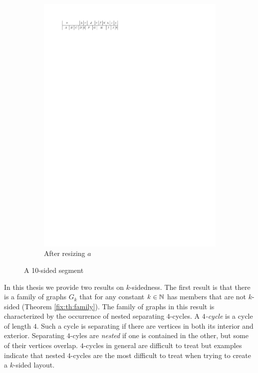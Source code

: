 \begin{figure}[b]
    \begin{subfigure}[b]{0.45 \textwidth}
      \centering
      \includegraphics{introduction/img/10sidedAfter.pdf}
      \caption{After resizing $a$}
      \label{fig:intro:10sidedAfter}
    \end{subfigure}
    \caption{A 10-sided segment}
    \label{fig:intro:10sided}
  \end{figure}


  In this thesis we provide two results on $k$-sidedness. The first result is that there is a family of graphs $G_k$ that for any constant $k \in \mathbb{N}$ has members that are not $k$-sided (Theorem \ref{fix:th:family}). The family of graphs in this result is characterized by the occurrence of nested separating $4$-cycles.
  A \emph{$4$-cycle} is a cycle of length $4$.
  Such a cycle is separating if there are vertices in both its interior and exterior.
  Separating $4$-cyles are \emph{nested} if one is contained in the other, but some of their vertices overlap.
  $4$-cycles in general are difficult to treat but examples indicate that nested $4$-cycles are the most difficult to treat when trying to create a $k$-sided layout.



